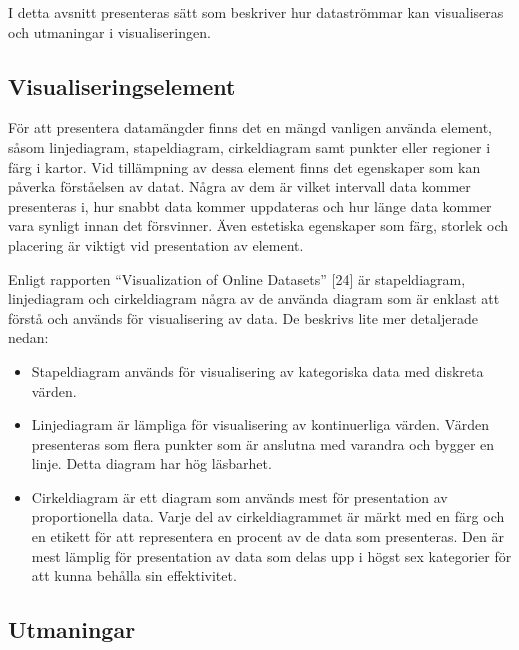 \documentclass[12pt]{kththesis}
\begin{document}
I detta avsnitt presenteras sätt som beskriver hur dataströmmar kan visualiseras och utmaningar i visualiseringen. 

\subsection{Visualiseringselement}

För att presentera datamängder finns det en mängd vanligen använda element, såsom linjediagram, stapeldiagram, cirkeldiagram samt punkter eller regioner i färg i kartor. Vid tillämpning av dessa element finns det egenskaper som kan påverka förståelsen av datat. Några av dem är vilket intervall data kommer presenteras i, hur snabbt data kommer uppdateras och hur länge data kommer vara synligt innan det försvinner. Även estetiska egenskaper som färg, storlek och placering är viktigt vid presentation av element.

Enligt rapporten “Visualization of Online Datasets” [24] är stapeldiagram, linjediagram och cirkeldiagram några av de använda diagram som är enklast att förstå och används för visualisering av data. De beskrivs lite mer detaljerade nedan:
\begin{itemize}
\item Stapeldiagram används för visualisering av kategoriska data med diskreta värden.
\item Linjediagram är lämpliga för visualisering av kontinuerliga värden. Värden presenteras som flera punkter som är anslutna med varandra och bygger en linje. Detta diagram har hög läsbarhet.
\item Cirkeldiagram är ett diagram som används mest för presentation av proportionella data. Varje del av cirkeldiagrammet är märkt med en färg och en etikett för att representera en procent av de data som presenteras. Den är mest lämplig för presentation av data som delas upp i högst sex kategorier för att kunna behålla sin effektivitet. 
\end{itemize}	

\subsection{Utmaningar}
\end{document}
